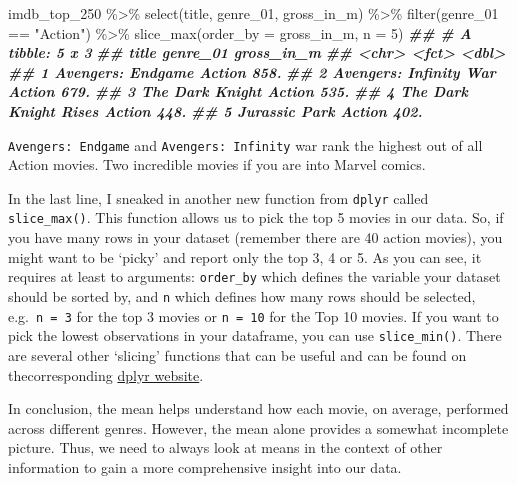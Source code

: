 \documentclass[
]{book}
\newenvironment{Shaded}{\begin{snugshade}}{\end{snugshade}}
\newcommand{\AttributeTok}[1]{\textcolor[rgb]{0.77,0.63,0.00}{#1}}
\newcommand{\DecValTok}[1]{\textcolor[rgb]{0.00,0.00,0.81}{#1}}
\newcommand{\DocumentationTok}[1]{\textcolor[rgb]{0.56,0.35,0.01}{\textbf{\textit{#1}}}}
\newcommand{\FunctionTok}[1]{\textcolor[rgb]{0.00,0.00,0.00}{#1}}
\newcommand{\NormalTok}[1]{#1}
\newcommand{\SpecialCharTok}[1]{\textcolor[rgb]{0.00,0.00,0.00}{#1}}
\newcommand{\StringTok}[1]{\textcolor[rgb]{0.31,0.60,0.02}{#1}}
\begin{document}
\begin{Shaded}
\begin{Highlighting}[]
\NormalTok{imdb\_top\_250 }\SpecialCharTok{\%\textgreater{}\%}
  \FunctionTok{select}\NormalTok{(title, genre\_01, gross\_in\_m) }\SpecialCharTok{\%\textgreater{}\%}
  \FunctionTok{filter}\NormalTok{(genre\_01 }\SpecialCharTok{==} \StringTok{"Action"}\NormalTok{) }\SpecialCharTok{\%\textgreater{}\%}
  \FunctionTok{slice\_max}\NormalTok{(}\AttributeTok{order\_by =}\NormalTok{ gross\_in\_m,}
            \AttributeTok{n =} \DecValTok{5}\NormalTok{)}
\DocumentationTok{\#\# \# A tibble: 5 x 3}
\DocumentationTok{\#\#   title                  genre\_01 gross\_in\_m}
\DocumentationTok{\#\#   \textless{}chr\textgreater{}                  \textless{}fct\textgreater{}         \textless{}dbl\textgreater{}}
\DocumentationTok{\#\# 1 Avengers: Endgame      Action         858.}
\DocumentationTok{\#\# 2 Avengers: Infinity War Action         679.}
\DocumentationTok{\#\# 3 The Dark Knight        Action         535.}
\DocumentationTok{\#\# 4 The Dark Knight Rises  Action         448.}
\DocumentationTok{\#\# 5 Jurassic Park          Action         402.}
\end{Highlighting}
\end{Shaded}

\texttt{Avengers:\ Endgame} and \texttt{Avengers:\ Infinity} war rank the highest out of all Action movies. Two incredible movies if you are into Marvel comics.

In the last line, I sneaked in another new function from \texttt{dplyr} called \texttt{slice\_max()}. This function allows us to pick the top 5 movies in our data. So, if you have many rows in your dataset (remember there are 40 action movies), you might want to be `picky' and report only the top 3, 4 or 5. As you can see, it requires at least to arguments: \texttt{order\_by} which defines the variable your dataset should be sorted by, and \texttt{n} which defines how many rows should be selected, e.g.~\texttt{n\ =\ 3} for the top 3 movies or \texttt{n\ =\ 10} for the Top 10 movies. If you want to pick the lowest observations in your dataframe, you can use \texttt{slice\_min()}. There are several other `slicing' functions that can be useful and can be found on thecorresponding \href{https://dplyr.tidyverse.org/reference/slice.html}{dplyr website}.

In conclusion, the mean helps understand how each movie, on average, performed across different genres. However, the mean alone provides a somewhat incomplete picture. Thus, we need to always look at means in the context of other information to gain a more comprehensive insight into our data.
\end{document}
